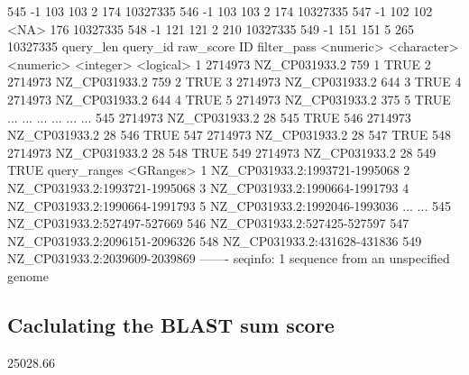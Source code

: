 \documentclass[letterpaper]{article}
\begin{document}
\begin{Schunk}
\begin{Soutput}
  545            -1          103          103         2           174  10327335
  546            -1          103          103         2           174  10327335
  547            -1          102          102      <NA>           176  10327335
  548            -1          121          121         2           210  10327335
  549            -1          151          151         5           265  10327335
      query_len      query_id raw_score        ID filter_pass
      <numeric>   <character> <numeric> <integer>   <logical>
    1   2714973 NZ_CP031933.2       759         1        TRUE
    2   2714973 NZ_CP031933.2       759         2        TRUE
    3   2714973 NZ_CP031933.2       644         3        TRUE
    4   2714973 NZ_CP031933.2       644         4        TRUE
    5   2714973 NZ_CP031933.2       375         5        TRUE
  ...       ...           ...       ...       ...         ...
  545   2714973 NZ_CP031933.2        28       545        TRUE
  546   2714973 NZ_CP031933.2        28       546        TRUE
  547   2714973 NZ_CP031933.2        28       547        TRUE
  548   2714973 NZ_CP031933.2        28       548        TRUE
  549   2714973 NZ_CP031933.2        28       549        TRUE
                       query_ranges
                          <GRanges>
    1 NZ_CP031933.2:1993721-1995068
    2 NZ_CP031933.2:1993721-1995068
    3 NZ_CP031933.2:1990664-1991793
    4 NZ_CP031933.2:1990664-1991793
    5 NZ_CP031933.2:1992046-1993036
  ...                           ...
  545   NZ_CP031933.2:527497-527669
  546   NZ_CP031933.2:527425-527597
  547 NZ_CP031933.2:2096151-2096326
  548   NZ_CP031933.2:431628-431836
  549 NZ_CP031933.2:2039609-2039869
  -------
  seqinfo: 1 sequence from an unspecified genome
\end{Soutput}
\end{Schunk}

\subsection{Caclulating the BLAST sum score}
\begin{Schunk}
	\begin{Soutput}
		[1] 25028.66
	\end{Soutput}
\end{Schunk}
\end{document}
